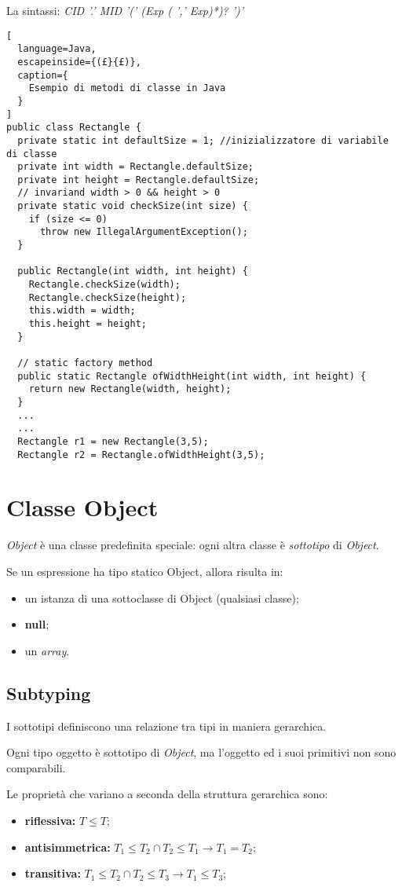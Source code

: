 La sintassi:
\emph{CID '.' MID '(' (Exp ( ',' Exp)*)? ')'}

\begin{lstlisting}[
  language=Java,
  escapeinside={(£}{£)},
  caption={
    Esempio di metodi di classe in Java
  }
]
public class Rectangle {
  private static int defaultSize = 1; //inizializzatore di variabile di classe
  private int width = Rectangle.defaultSize;
  private int height = Rectangle.defaultSize;
  // invariand width > 0 && height > 0
  private static void checkSize(int size) {
    if (size <= 0)
      throw new IllegalArgumentException();
  }
  
  public Rectangle(int width, int height) {
    Rectangle.checkSize(width);
    Rectangle.checkSize(height);
    this.width = width;
    this.height = height;
  }

  // static factory method
  public static Rectangle ofWidthHeight(int width, int height) {
    return new Rectangle(width, height);
  }
  ...
  ...
  Rectangle r1 = new Rectangle(3,5);
  Rectangle r2 = Rectangle.ofWidthHeight(3,5);
\end{lstlisting}

\section{Classe Object}
\emph{Object} è una classe predefinita speciale: ogni altra classe è
\textit{sottotipo} di \emph{Object}.

Se un espressione ha tipo statico Object, allora risulta in:
\begin{itemize}
  \item un istanza di una sottoclasse di Object (qualsiasi classe);
  \item \textbf{null};
  \item un \emph{array}.
\end{itemize}

\subsection{Subtyping}
I sottotipi definiscono una relazione tra tipi in maniera gerarchica.

Ogni tipo oggetto è sottotipo di \emph{Object}, ma l'oggetto ed i suoi
primitivi non sono comparabili.

Le proprietà che variano a seconda della struttura gerarchica sono:
\begin{itemize}
  \item \textbf{riflessiva:} $T\leq T$;
  \item \textbf{antisimmetrica:} $T_1\leq T_2\cap T_2\leq T_1\rightarrow
    T_1=T_2$;
  \item \textbf{transitiva:} $T_1\leq T_2\cap T_2\leq T_3\rightarrow
    T_1\leq T_3$;

\end{itemize}

